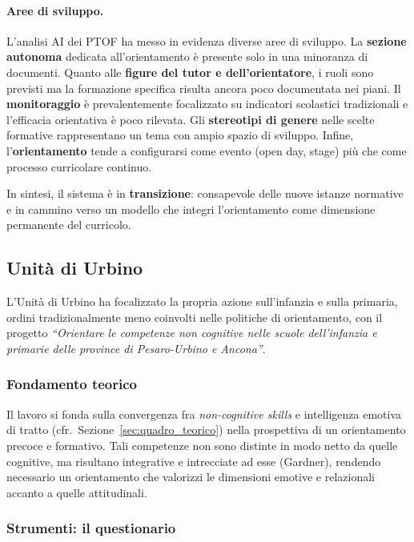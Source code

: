 \documentclass[12pt,a4paper]{article}
\begin{document}
\paragraph{Aree di sviluppo.}
L'analisi AI dei PTOF ha messo in evidenza diverse aree di sviluppo. La \textbf{sezione autonoma} dedicata all'orientamento \`e presente solo in una minoranza di documenti. Quanto alle \textbf{figure del tutor e dell'orientatore}, i ruoli sono previsti ma la formazione specifica risulta ancora poco documentata nei piani. Il \textbf{monitoraggio} \`e prevalentemente focalizzato su indicatori scolastici tradizionali e l'efficacia orientativa \`e poco rilevata. Gli \textbf{stereotipi di genere} nelle scelte formative rappresentano un tema con ampio spazio di sviluppo. Infine, l'\textbf{orientamento} tende a configurarsi come evento (open day, stage) pi\`u che come processo curricolare continuo.

In sintesi, il sistema \`e in \textbf{transizione}: consapevole delle nuove istanze normative e in cammino verso un modello che integri l'orientamento come dimensione permanente del curricolo.


\subsection{Unit\`a di Urbino}

L'Unit\`a di Urbino ha focalizzato la propria azione sull'infanzia e sulla primaria, ordini tradizionalmente meno coinvolti nelle politiche di orientamento, con il progetto \textit{``Orientare le competenze non cognitive nelle scuole dell'infanzia e primarie delle province di Pesaro-Urbino e Ancona''}.

\subsubsection{Fondamento teorico}

Il lavoro si fonda sulla convergenza fra \textit{non-cognitive skills} e intelligenza emotiva di tratto (cfr.\ Sezione~\ref{sec:quadro_teorico}) nella prospettiva di un orientamento precoce e formativo. Tali competenze non sono distinte in modo netto da quelle cognitive, ma risultano integrative e intrecciate ad esse (Gardner), rendendo necessario un orientamento che valorizzi le dimensioni emotive e relazionali accanto a quelle attitudinali.

\subsubsection{Strumenti: il questionario}
\end{document}
